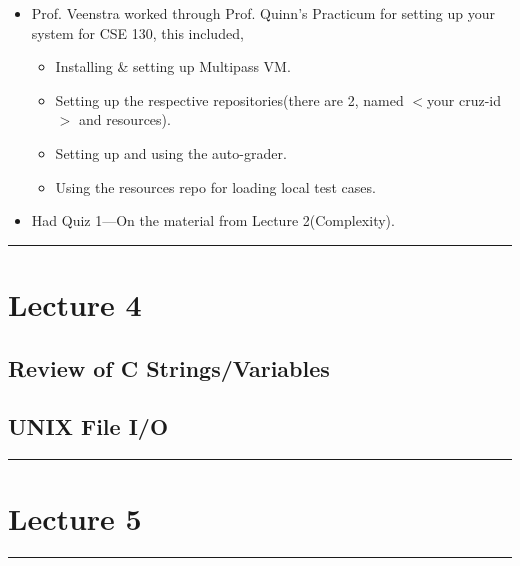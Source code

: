 \documentclass{article}
\begin{document}
\begin{itemize}
    \item Prof. Veenstra worked through Prof. Quinn's Practicum for setting up your system for CSE 130, this included,
    \begin{itemize}
        \item Installing \& setting up Multipass VM.
        \item Setting up the respective repositories(there are 2, named $<$your cruz-id$>$ and resources).
        \item Setting up and using the auto-grader.
        \item Using the resources repo for loading local test cases.
    \end{itemize}
    \item Had Quiz 1---On the material from Lecture 2(Complexity).
\end{itemize}
\begin{center}
	\rule{450pt}{1pt} 
\end{center}
\newpage

\section*{Lecture 4}

\subsection*{Review of C Strings/Variables}

\subsection*{UNIX File I/O}





\begin{center}
	\rule{450pt}{1pt} 
\end{center}
\newpage

\section*{Lecture 5}





\begin{center}
	\rule{450pt}{1pt} 
\end{center}
\newpage
\end{document}
